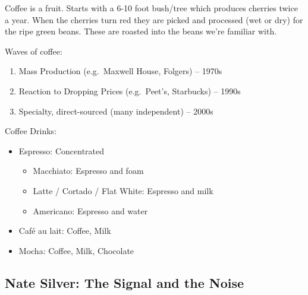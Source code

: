 \documentclass[
]{article}
\begin{document}
Coffee is a fruit. Starts with a 6-10 foot bush/tree which produces
cherries twice a year. When the cherries turn red they are picked and
processed (wet or dry) for the ripe green beans. These are roasted into
the beans we're familiar with.

Waves of coffee:

\begin{enumerate}
\def\labelenumi{\arabic{enumi}.}
\item
  Mass Production (e.g.~Maxwell House, Folgers) -- 1970s
\item
  Reaction to Dropping Prices (e.g.~Peet's, Starbucks) -- 1990s
\item
  Specialty, direct-sourced (many independent) -- 2000s
\end{enumerate}

Coffee Drinks:

\begin{itemize}
\item
  Espresso: Concentrated

  \begin{itemize}
  \item
    Macchiato: Espresso and foam
  \item
    Latte / Cortado / Flat White: Espresso and milk
  \item
    Americano: Espresso and water
  \end{itemize}
\item
  Café au lait: Coffee, Milk
\item
  Mocha: Coffee, Milk, Chocolate
\end{itemize}

\hypertarget{nate-silver-the-signal-and-the-noise}{%
\subsection{Nate Silver: The Signal and the
Noise}\label{nate-silver-the-signal-and-the-noise}}
\end{document}
